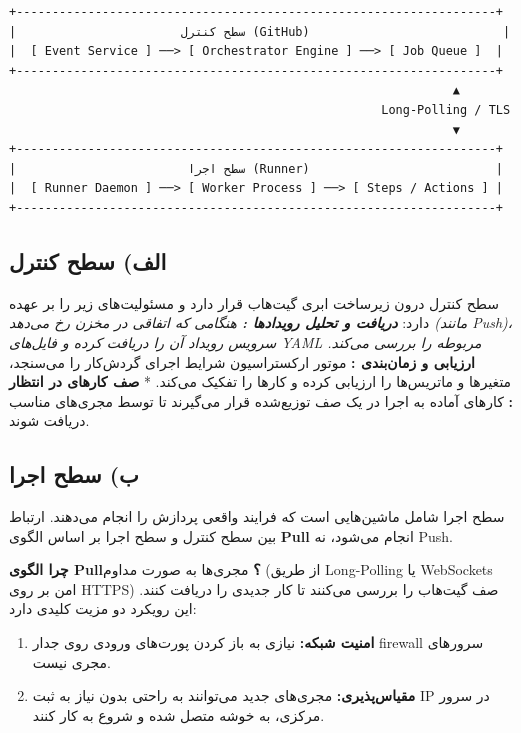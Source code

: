 \documentclass[12pt,a4paper,openany]{book}
\begin{document}
\begin{LTR}
\begin{verbatim}
+-------------------------------------------------------------------+
|                       سطح کنترل (GitHub)                           |
|  [ Event Service ] ──> [ Orchestrator Engine ] ──> [ Job Queue ]  |
+-------------------------------------------------------------------+
                                                              ▲
                                                    Long-Polling / TLS
                                                              ▼
+-------------------------------------------------------------------+
|                        سطح اجرا (Runner)                          |
|  [ Runner Daemon ] ──> [ Worker Process ] ──> [ Steps / Actions ] |
+-------------------------------------------------------------------+
\end{verbatim}
\end{LTR}

\subsection{الف) سطح کنترل }

سطح کنترل درون زیرساخت ابری گیت‌هاب قرار دارد و مسئولیت‌های زیر را بر عهده دارد: \textit{ \textbf{دریافت و تحلیل رویدادها :} هنگامی که اتفاقی در مخزن رخ می‌دهد (مانند Push)، سرویس رویداد آن را دریافت کرده و فایل‌های YAML مربوطه را بررسی می‌کند. } \textbf{ارزیابی و زمان‌بندی :} موتور ارکستراسیون شرایط اجرای گردش‌کار را می‌سنجد، متغیرها و ماتریس‌ها را ارزیابی کرده و کارها  را تفکیک می‌کند. * \textbf{صف کارهای در انتظار :} کارهای آماده به اجرا در یک صف توزیع‌شده قرار می‌گیرند تا توسط مجری‌های مناسب دریافت شوند.

\subsection{ب) سطح اجرا }

سطح اجرا شامل ماشین‌هایی است که فرایند واقعی پردازش را انجام می‌دهند. ارتباط بین سطح کنترل و سطح اجرا بر اساس الگوی \textbf{Pull} انجام می‌شود، نه Push.

\textbf{چرا الگوی Pull؟} مجری‌ها به صورت مداوم (از طریق Long-Polling یا WebSockets امن بر روی HTTPS) صف گیت‌هاب را بررسی می‌کنند تا کار جدیدی را دریافت کنند. این رویکرد دو مزیت کلیدی دارد:

\begin{enumerate}
\item \textbf{امنیت شبکه:} نیازی به باز کردن پورت‌های ورودی  روی جدار firewall سرورهای مجری نیست.
\item \textbf{مقیاس‌پذیری:} مجری‌های جدید می‌توانند به راحتی بدون نیاز به ثبت IP در سرور مرکزی، به خوشه متصل شده و شروع به کار کنند.
\end{enumerate}
\end{document}
